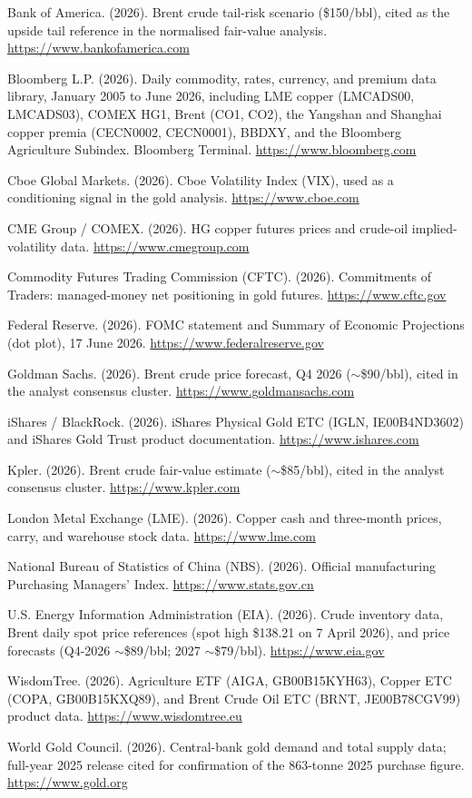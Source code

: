 \documentclass[11pt,a4paper]{article}
\begin{document}
\clearpage
\begin{fshfreferences}
\item Bank of America. (2026). Brent crude tail-risk scenario (\$150/bbl), cited as the upside tail reference in the normalised fair-value analysis. \url{https://www.bankofamerica.com}
\item Bloomberg L.P. (2026). Daily commodity, rates, currency, and premium data library, January 2005 to June 2026, including LME copper (LMCADS00, LMCADS03), COMEX HG1, Brent (CO1, CO2), the Yangshan and Shanghai copper premia (CECN0002, CECN0001), BBDXY, and the Bloomberg Agriculture Subindex. Bloomberg Terminal. \url{https://www.bloomberg.com}
\item Cboe Global Markets. (2026). Cboe Volatility Index (VIX), used as a conditioning signal in the gold analysis. \url{https://www.cboe.com}
\item CME Group / COMEX. (2026). HG copper futures prices and crude-oil implied-volatility data. \url{https://www.cmegroup.com}
\item Commodity Futures Trading Commission (CFTC). (2026). Commitments of Traders: managed-money net positioning in gold futures. \url{https://www.cftc.gov}
\item Federal Reserve. (2026). FOMC statement and Summary of Economic Projections (dot plot), 17 June 2026. \url{https://www.federalreserve.gov}
\item Goldman Sachs. (2026). Brent crude price forecast, Q4 2026 (\(\sim\)\$90/bbl), cited in the analyst consensus cluster. \url{https://www.goldmansachs.com}
\item iShares / BlackRock. (2026). iShares Physical Gold ETC (IGLN, IE00B4ND3602) and iShares Gold Trust product documentation. \url{https://www.ishares.com}
\item Kpler. (2026). Brent crude fair-value estimate (\(\sim\)\$85/bbl), cited in the analyst consensus cluster. \url{https://www.kpler.com}
\item London Metal Exchange (LME). (2026). Copper cash and three-month prices, carry, and warehouse stock data. \url{https://www.lme.com}
\item National Bureau of Statistics of China (NBS). (2026). Official manufacturing Purchasing Managers' Index. \url{https://www.stats.gov.cn}
\item U.S. Energy Information Administration (EIA). (2026). Crude inventory data, Brent daily spot price references (spot high \$138.21 on 7 April 2026), and price forecasts (Q4-2026 \(\sim\)\$89/bbl; 2027 \(\sim\)\$79/bbl). \url{https://www.eia.gov}
\item WisdomTree. (2026). Agriculture ETF (AIGA, GB00B15KYH63), Copper ETC (COPA, GB00B15KXQ89), and Brent Crude Oil ETC (BRNT, JE00B78CGV99) product data. \url{https://www.wisdomtree.eu}
\item World Gold Council. (2026). Central-bank gold demand and total supply data; full-year 2025 release cited for confirmation of the 863-tonne 2025 purchase figure. \url{https://www.gold.org}
\end{fshfreferences}

\end{document}
